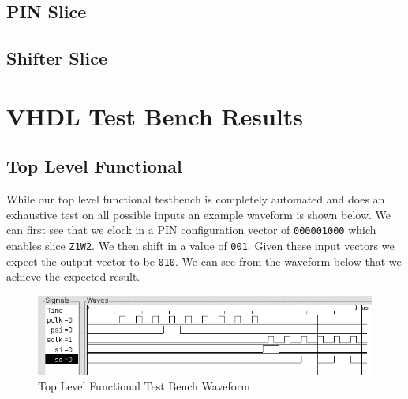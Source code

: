     \subsection{PIN Slice}
        
    \subsection{Shifter Slice}
        

\section{VHDL Test Bench Results}
    \subsection{Top Level Functional}
        While our top level functional testbench is completely automated and
        does an exhaustive test on all possible inputs an example waveform is
        shown below. We can first see that we clock in a PIN configuration
        vector of \texttt{000001000} which enables slice \texttt{Z1W2}. We then
        shift in a value of \texttt{001}. Given these input vectors we expect
        the output vector to be \texttt{010}. We can see from the waveform
        below that we achieve the expected result.
        \begin{figure}[H]
            \centering
            \includegraphics[width=\linewidth]{../../doc/vhdl_sim_pics/top.png}
            \caption{Top Level Functional Test Bench Waveform}
        \end{figure}
